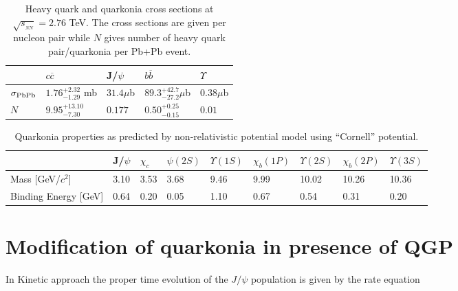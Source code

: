 \documentclass[aps,prc,preprint,superscriptaddress,showpacs,showkeys]{revtex4-1}
\begin{document}
\begin{table}
\caption[]{Heavy quark and quarkonia cross sections at
$\sqrt{s_{_{NN}}}= 2.76$ TeV. The cross sections are given per nucleon pair while
$N$ gives number of heavy quark pair/quarkonia per Pb+Pb event.}
\label{NLOcros}
\begin{tabular}{l|l|l|l|l} 
\hline 
\hline
                     & $ c \overline c$           &J/$\psi$      & $ b \overline b$           & $\Upsilon$   \\              
\hline
$\sigma_{\rm PbPb}$  & $1.76^{+2.32}_{-1.29}$ mb  & $31.4 \mu$b  & $89.3^{+42.7}_{-27.2} \mu$b  & $0.38 \mu$b  \\
$N$                  &$9.95^{+13.10}_{-7.30}$     & $0.177$      & $0.50^{+0.25}_{-0.15}$     & $0.01$       \\
\hline
\hline
\end{tabular}
\end{table}


\begin{table}
\caption[]{Quarkonia properties as predicted by non-relativistic potential model using 
``Cornell'' potential\cite{YSuppAbdShuk}.}
\label{QuarkoniaProperties}
\begin{tabular}{l|l|l|l|l|l|l|l|l} 
\hline   
\hline
    &J/$\psi$  &$\chi_c$  &$\psi(2S)$ &$\Upsilon(1S)$ &$\chi_b(1P)$ &$\Upsilon(2S)$ &$\chi_b(2P)$ &$\Upsilon(3S)$ \\ 
\hline 
Mass [GeV/$c^2$]                      &3.10     &3.53  &3.68  &9.46  &9.99  &10.02  &10.26   &10.36 \\
Binding Energy [GeV]                  &0.64     &0.20  &0.05  &1.10  &0.67  &0.54   &0.31    &0.20 \\
\hline
\hline
\end{tabular}
\end{table}


\section{Modification of quarkonia in presence of QGP}
In Kinetic approach \cite{Thews} the proper time evolution of the $J/\psi$ population is given by the rate equation 
\end{document}
